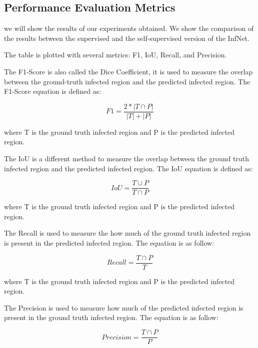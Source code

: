 \subsection{Performance Evaluation Metrics}
we will show the results of our experiments obtained. We show the comparison of the results between the supervised and the self-supervised version of the InfNet.

The table is plotted with several metrics: F1, IoU, Recall, and Precision. 

The F1-Score is also called the Dice Coefficient, it is used to measure the overlap between the ground-truth infected region and the predicted infected region. The F1-Score equation is defined as:

\begin{equation}
F1 = \frac{2 * | T \cap P |}{|T| + |P|}
\end{equation}

where T is the ground truth infected region and P is the predicted infected region.

The IoU is a different method to measure the overlap between the ground truth infected region and the predicted infected region. The IoU equation is defined as:

\begin{equation}
IoU = \frac{T \cup P}{T \cap P}
\end{equation}

where T is the ground truth infected region and P is the predicted infected region.

The Recall is used to measure the how much of the ground truth infected region is present in the predicted infected region. The equation is as follow:

\begin{equation}
Recall = \frac{T \cap P}{T}
\end{equation}

where T is the ground truth infected region and P is the predicted infected region.

The Precision is used to measure how much of the predicted infected region is present in the ground truth infected region. The equation is as follow:

\begin{equation}
Precision = \frac{T \cap P}{P}
\end{equation}

